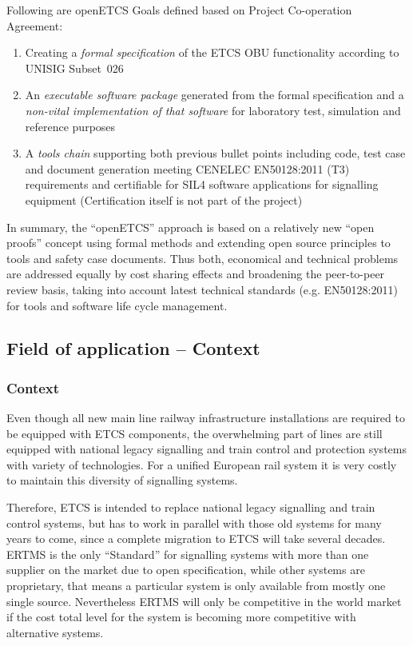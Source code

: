\documentclass{template/openetcs_article}
\begin{document}
Following are openETCS Goals defined based on Project Co-operation Agreement:
\begin{enumerate}
\item Creating a \emph{formal specification} of the ETCS OBU functionality according to UNISIG Subset~026

\item An \emph{executable software package} generated from the formal specification and a \emph{non-vital implementation of that software} for laboratory test, simulation and reference purposes

\item A \emph{tools chain} supporting both previous bullet points including code, test case and document generation meeting CENELEC EN50128:2011 (T3) requirements and certifiable for SIL4 software applications for signalling equipment (Certification itself is not part of the project)
\end{enumerate}


In summary, the ``openETCS'' approach is based on a relatively new ``open proofs'' concept using formal methods and extending open source principles to tools and safety case documents. Thus both, economical and technical problems are addressed equally by cost sharing effects and broadening the peer-to-peer review basis, taking into account latest technical standards (e.g. EN50128:2011) for tools and software life cycle management.


\subsection{Field of application -- Context}
\subsubsection{Context}
Even though all new main line railway infrastructure installations are required to be equipped with ETCS components, the overwhelming part of lines are still equipped with national legacy signalling and train control and protection systems with variety of technologies. For a unified European rail system it is very costly to maintain this diversity of signalling systems.

Therefore, ETCS is intended to replace national legacy signalling and train control systems, but has to work in parallel with those old systems for many years to come, since a complete migration to ETCS will take several decades. ERTMS is the only ``Standard'' for signalling systems with more than one supplier on the market due to open specification, while other systems are proprietary, that means a particular system is only available from mostly one single source. Nevertheless ERTMS will only be competitive in the world market if the cost total level for the system is becoming more competitive with alternative systems.
\end{document}
